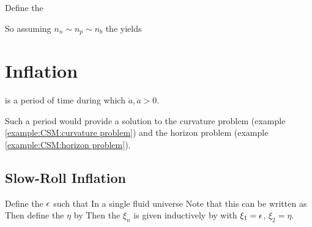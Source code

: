 \documentclass{article}
\begin{document}
\begin{definition}
Define the  
\end{definition}

So assuming $n_n\sim n_p\sim n_b$ the  yields

\section{Inflation}

\begin{definition}[Inflation]
 is a period of time during which $\dot{a},\ddot{a} > 0$. 
\end{definition}

Such a period would provide a solution to the curvature problem (example \ref{example:CSM:curvature problem}) and the horizon problem (example \ref{example:CSM:horizon problem}). 

\subsection{Slow-Roll Inflation}

\begin{definition}
Define the  $\epsilon$ such that 
In a single fluid universe 
Note that this can be written as 
Then define the  $\eta$ by 
Then the  $\xi_n$ is given inductively by 
with $\xi_1 = \epsilon$, $\xi_2 = \eta$. 
\end{definition}
\end{document}
